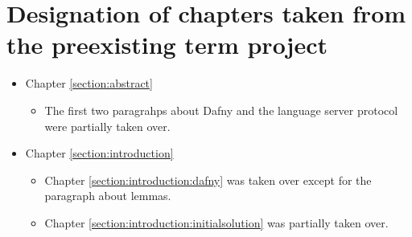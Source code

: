 \section{Designation of chapters taken from the preexisting term project}
\begin{itemize}
    \item Chapter \ref{section:abstract}
        \begin{itemize}
            \item The first two paragrahps about Dafny and the language server protocol were partially taken over.
        \end{itemize}
    \item Chapter \ref{section:introduction}
        \begin{itemize}
            \item Chapter \ref{section:introduction:dafny} was taken over except for the paragraph about lemmas.
            \item Chapter \ref{section:introduction:initialsolution} was partially taken over.
        \end{itemize}
\end{itemize}